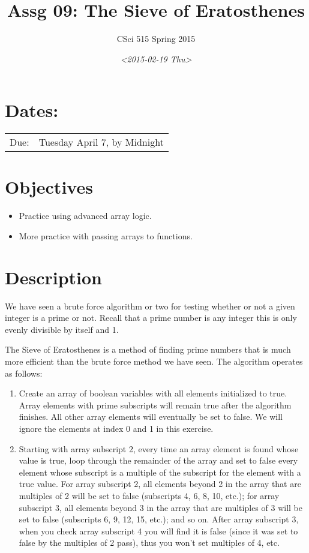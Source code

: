 \documentclass[11pt]{article}
\author{CSci 515 Spring 2015}
\date{\textit{<2015-02-19 Thu>}}
\title{Assg 09: The Sieve of Eratosthenes}
\begin{document}
\maketitle

\section*{Dates:}
\label{sec-1}
\begin{center}
\begin{tabular}{ll}
Due: & Tuesday April 7, by Midnight\\
\end{tabular}
\end{center}
\section*{Objectives}
\label{sec-2}
\begin{itemize}
\item Practice using advanced array logic.
\item More practice with passing arrays to functions.
\end{itemize}
\section*{Description}
\label{sec-3}
We have seen a brute force algorithm or two for testing whether or not
a given integer is a prime or not.  Recall that a prime number is any
integer this is only evenly divisible by itself and 1.  

The Sieve of Eratosthenes is a method of finding prime numbers that
is much more efficient than the brute force method we have seen.
The algorithm operates as follows:

\begin{enumerate}
\item Create an array of boolean variables with all elements initialized
to true.  Array elements with prime subscripts will remain true
after the algorithm finishes.  All other array elements will
eventually be set to false.  We will ignore the elements at index 0
and 1 in this exercise.
\item Starting with array subscript 2, every time an array element is
found whose value is true, loop through the remainder of the array
and set to false every element whose subscript is a multiple of the
subscript for the element with a true value.  For array subscript
2, all elements beyond 2 in the array that are multiples of 2 will
be set to false (subscripts 4, 6, 8, 10, etc.); for array subscript 
3, all elements beyond 3 in the array that are multiples of 3 will be
set to false (subscripts 6, 9, 12, 15, etc.); and so on.  After
array subscript 3, when you check array subscript 4 you will find it
is false (since it was set to false by the multiples of 2 pass), thus
you won't set multiples of 4, etc.
\end{enumerate}
\end{document}
